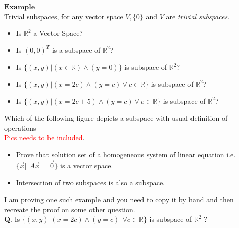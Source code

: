 \documentclass{article}
\begin{document}
$\boldsymbol{Example}$\\

Trivial subspaces, for any vector space $V, \{0\}$ and $V$ are \textit{trivial subspaces}.
\begin{itemize}
    \item Is $\mathbb{R}^2$ a Vector Space?
    \item Is $(0,0)^T$ is a subspace of $\mathbb{R}^2$?
    \item Is \begin{math}\{(x,y) | (x \in \mathbb{R}) \wedge (y = 0)\}\end{math} is subspace of $\mathbb{R}^2$?
    \item Is \begin{math}\{(x,y) | (x = 2c) \wedge (y = c) ~ \forall ~ c \in \mathbb{R}\}\end{math} is subspace of $\mathbb{R}^2$?
    \item Is \begin{math}\{(x,y) | (x = 2c + 5) \wedge (y = c) ~ \forall ~ c \in \mathbb{R}\}\end{math} is subspace of $\mathbb{R}^2$?
\end{itemize}
Which of the following figure depicts a subspace with usual definition of operations\\
\textcolor{red}{Pics needs to be included}.


\begin{itemize}
    \item Prove that solution set of a homogeneous system of linear equation i.e. $\{\vec{x}|~~A\vec{x} = \vec{0}\}$ is a vector space.
    \item Intersection of two subspaces is also a subspace.
\end{itemize}

I am proving one such example and you need to copy it by hand and then recreate the proof on some other question.\\

$\boldsymbol{Q.}$ Is \begin{math} \{(x,y)|(x = 2c) \wedge (y=c)~~\forall c \in \mathbb{R}\}\end{math} is subspace of $\mathbb{R}^2$ ?\\

\end{document}
